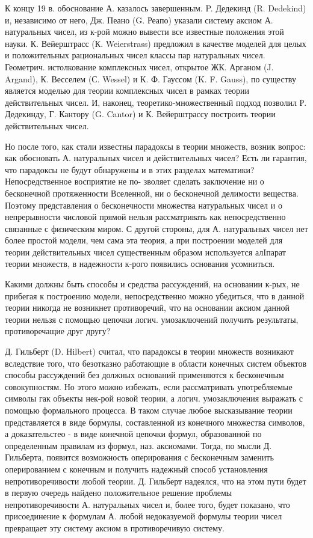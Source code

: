 \documentclass[10pt]{article}
\begin{document}
К концу 19 в. обоснование А. казалось завершенным. P. Дедекинд (R. Dedekind) и, независимо от него, Дж. Пеано (G. Реапо) указали систему аксиом А. натуральных чисел, из к-рой можно вывести все известные положения этой науки. К. Вейерштрасс (К. Weierstrass) предложил в качестве моделей для целых и положительных рациональных чисел классы пар натуральных чисел. Геометрич. истолкование комплексных чисел, открытое ЖК. Арганом (J. Argand), К. Весселем (С. Wessel) и К. Ф. Гауссом (K. F. Gauss), по существу является моделью для теории комплексных чисел в рамках теории действительных чисел. И, наконец, теоретико-множественный подход позволил Р. Дедекинду, Г. Кантору (G. Cantor) и К. Вейерштрассу построить теории действительных чисел.



Но после того, как стали известны парадоксы в теории множеств, возник вопрос: как обосновать А. натуральных чисел и действительных чисел? Есть ли гарантия, что парадоксы не будут обнаружены и в этих разделах математики? Непосредственное восприятие не по- зволяет сделать заключение ни о бесконечной протяженности Вселенной, ни о бесконечной делимости вещества. Поэтому представления о бесконечности множества натуральных чисел и о непрерывности числовой прямой нельзя рассматривать как непосредственно связанные с физическим миром. С другой стороны, для А. натуральных чисел нет более простой модели, чем сама эта теория, а при построении моделей для теории действительных чисел существенным образом используется алIпарат теории множеств, в надежности к-рого появились основания усомниться.



Какими должны быть способы и средства рассуждений, на основании к-рых, не прибегая к построению модели, непосредственно можно убедиться, что в данной теории никогда не возникнет противоречий, что на основании аксиом данной теории нельзя с помощью цепочки логич. умозаключений получить результаты, противоречащие друг другу?



Д. Гильберт (D. Hilbert) считал, что парадоксы в теории множеств возникают вследствие того, что безотказно работающие в области конечных систем объектов способы рассуждений без должных оснований применяются к бесконечным совокупностям. Но этого можно избежать, если рассматривать употребляемые символы гак объекты нек-рой новой теории, а логич. умозаключения выражать с помощью формального процесса. В таком случае любое высказывание теории представляется в виде бормулы, составленной из конечного множества символов, а доказательстео - в виде конечной цепочки формул, образованной по определенным правилам из формул, наз. аксиомами. Тогда, по мысли Д. Гильберта, появится возможность оперирования с бесконечным заменить оперированием с конечным и получить надежный способ установления непротиворечивости любой теории. Д. Гильберт надеялся, что на этом пути будет в первую очередь найдено положительное решение проблемы непротиворечивости А. натуральных чисел и, более того, будет показано, что присоединение к формулам А. любой недоказуемой формулы теории чисел превращает эту систему аксиом в противоречивую систему.
\end{document}
